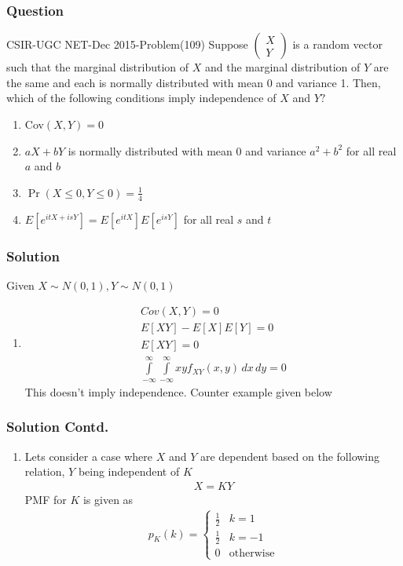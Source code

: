 \documentclass{beamer}
\providecommand{\pr}[1]{\ensuremath{\Pr\left(#1\right)}}
\providecommand{\sbrak}[1]{\ensuremath{{}\left[#1\right]}}
\providecommand{\brak}[1]{\ensuremath{\left(#1\right)}}
\begin{document}
\begin{frame}
\frametitle{Question}
\begin{block}{CSIR-UGC NET-Dec 2015-Problem(109)}
Suppose
$\begin{pmatrix}
X\\
Y
\end{pmatrix}$ is a random vector such that the marginal distribution of $X$ and the marginal distribution of $Y$ are the same and each is normally distributed with mean 0 and variance 1. Then, which of the following conditions imply independence of $X$ and $Y?$
\begin{enumerate}
\item Cov$\brak{X,Y}=0$
\item $aX+bY$ is normally distributed with mean 0 and variance $a^2+b^2$ for all real $a$ and $b$
\item $\pr{X\le 0, Y\le0}=\frac{1}{4}$
\item $E\sbrak{e^{itX+isY}}=E\sbrak{e^{itX}}E\sbrak{e^{isY}}$ for all real $s$ and $t$
\end{enumerate}
\end{block}
\end{frame}

\begin{frame}
\frametitle{Solution}
Given $X\sim N\brak{0,1}, Y\sim N(0,1)$
\begin{enumerate}[<+->]
\item
\begin{align}
Cov(X,Y)=0\\
E\sbrak{XY}-E\sbrak{X}E\sbrak{Y}=0\\
E\sbrak{XY}=0\\
\displaystyle \int\limits_{-\infty}^{\infty} \int\limits_{-\infty}^{\infty}xyf_{XY}(x,y)\, dx\,dy=0
\end{align}
This doesn't imply independence. Counter example given below
\end{enumerate}
\end{frame}

\begin{frame}
\frametitle{Solution Contd.}
\begin{enumerate}[<+->]
\item
Lets consider a case where $X$ and $Y$ are dependent based on the following relation, $Y$ being independent of $K$
\begin{align}
X=KY \label{eq:case}
\end{align}
PMF for $K$ is given as
\begin{align}
p_K(k)=
\begin{cases}
\frac{1}{2} &k=1\\
\frac{1}{2} & k=-1\\
0 & \text{otherwise}
\end{cases}
\end{align}
\end{enumerate}
\end{frame}
\end{document}
